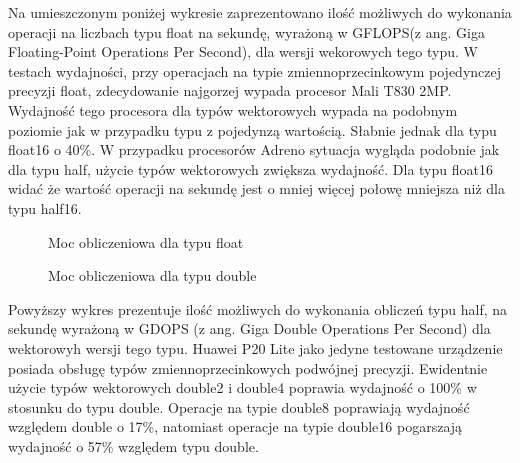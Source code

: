 Na umieszczonym poniżej wykresie zaprezentowano ilość możliwych do wykonania operacji na liczbach typu float na sekundę, wyrażoną w GFLOPS(z ang. Giga Floating-Point Operations Per Second), dla wersji wekorowych tego typu. W testach wydajności, przy operacjach na typie zmiennoprzecinkowym pojedynczej precyzji float, zdecydowanie najgorzej wypada procesor Mali T830 2MP. Wydajność tego procesora dla typów wektorowych wypada na podobnym poziomie jak w przypadku typu z pojedynzą wartością. Słabnie jednak dla typu float16 o 40\%. W przypadku procesorów Adreno sytuacja wygląda podobnie jak dla typu half, użycie typów wektorowych zwiększa wydajność. Dla typu float16 widać że wartość operacji na sekundę jest o mniej więcej połowę mniejsza niż dla typu half16.
\begin{figure}[H]
\caption{Moc obliczeniowa dla typu float}
\end{figure}

\begin{figure}[H]
\caption{Moc obliczeniowa dla typu double}
\end{figure}
Powyższy wykres prezentuje ilość możliwych do wykonania obliczeń typu half, na sekundę wyrażoną w GDOPS (z ang. Giga Double Operations Per Second) dla wektorowyh wersji tego typu. Huawei P20 Lite jako jedyne testowane urządzenie posiada obsługę typów zmiennoprzecinkowych podwójnej precyzji. Ewidentnie użycie typów wektorowych double2 i double4 poprawia wydajność o 100\% w stosunku do typu double. Operacje na typie double8 poprawiają wydajność względem double o 17\%, natomiast operacje na typie double16 pogarszają wydajność o 57\% względem typu double.

